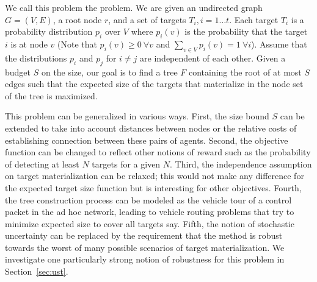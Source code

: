 We call this problem the  problem.  We are given an undirected graph $G =
(V,E)$, a root node $r$, and a set of targets $T_i, i = 1 \ldots
t$. Each target $T_i$ is a probability distribution $p_i$ over $V$
where $p_i(v)$ is the probability that the target $i$ is at node $v$
(Note that $p_i(v) \geq 0 \ \forall v$ and $\sum_{v \in V} p_i(v) = 1
\ \forall i$). Assume that the distributions $p_i$ and $p_j$ for $i
\neq j$ are independent of each other. Given a budget $S$ on the size, our
goal is to find a tree $F$ containing the root of at most $S$ edges
such that the expected size of the targets that materialize in the
node set of the tree is maximized.

This problem can be generalized in various ways. First, the size bound
$S$ can be extended to take into account distances between nodes or
the relative costs of establishing connection between these pairs of
agents. Second, the objective function can be changed to reflect other
notions of reward such as the probability of detecting at least $N$
targets for a given $N$. Third, the independence assumption on target
materialization can be relaxed; this would not make any difference for
the expected target size function but is interesting for other
objectives. Fourth, the tree construction process can be modeled as
the vehicle tour of a control packet in the ad hoc network, leading to
vehicle routing problems that try to minimize expected size to cover
all targets say. Fifth, the notion of stochastic uncertainty can be
replaced by the requirement that the method is robust towards the
worst of many possible scenarios of target materialization. We
investigate one particularly strong notion of robustness for this
problem in Section~\ref{sec:ust}.



